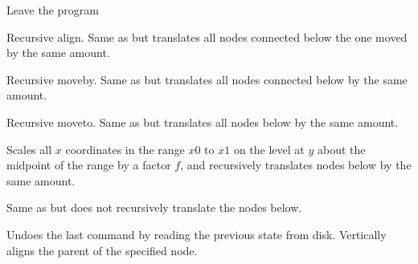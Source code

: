  Leave the program

Recursive align.  Same as  but translates all nodes connected below
the one moved by the same amount.

Recursive moveby.  Same as  but translates all nodes connected below
by the same amount.

Recursive moveto.  Same as  but translates all nodes below by the
same amount.

Scales all $x$ coordinates in the range $x0$ to $x1$ on the level at $y$ about the
midpoint of the range by a factor $f$, and recursively translates nodes below
by the same amount.

Same as  but does not recursively translate the nodes below.

 Undoes the last command by reading the previous state from disk.
 Vertically aligns the parent of the specified node.




